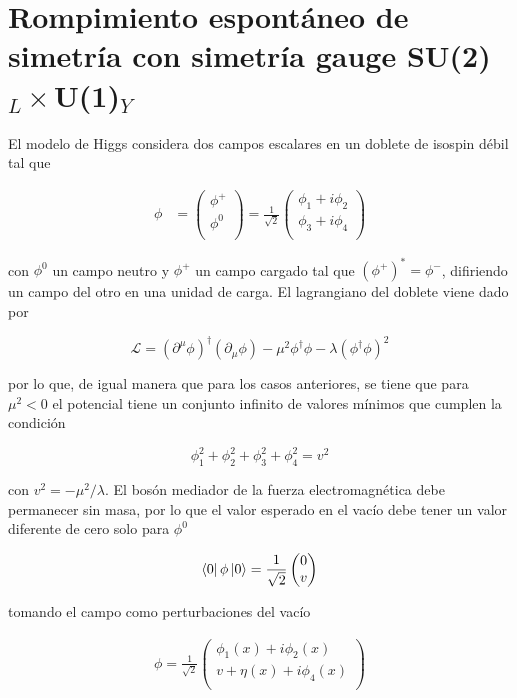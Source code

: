 \section{Rompimiento espontáneo de simetría con simetría gauge SU(2)$_L\times$U(1)$_Y$}

El modelo de Higgs considera dos campos escalares en un doblete de isospin débil tal que

\begin{align}
    \phi &= \begin{pmatrix}
           \phi^+ \\
           \phi^0 \\
         \end{pmatrix}
         = \frac{1}{\sqrt{2}} \begin{pmatrix}
            \phi_1+i\phi_2\\
            \phi_3+i\phi_4\\
         \end{pmatrix}
  \end{align}

con $\phi^0$ un campo neutro y $\phi^+$ un campo cargado tal que $(\phi^+)^* = \phi^-$, difiriendo un campo del otro en una unidad de carga. El lagrangiano del doblete viene dado por

$$ \mathcal{L} = (\partial^{\mu}\phi)^{\dagger} (\partial_{\mu}\phi) - \mu^2 \phi^{\dagger}\phi - \lambda(\phi^{\dagger}\phi)^2 $$

por lo que, de igual manera que para los casos anteriores, se tiene que para $\mu^2<0$ el potencial tiene un conjunto infinito de valores mínimos que cumplen la condición

$$ \phi_1^2 + \phi_2^2 + \phi_3^2 + \phi_4^2 = v^2 $$

con $v^2 =-\mu^2/\lambda$. El bosón mediador de la fuerza electromagnética debe permanecer sin masa, por lo que el valor esperado en el vacío debe tener un valor diferente de cero solo para $\phi^0$

\begin{align}
    \bra{0}\phi\ket{0} = \frac{1}{\sqrt{2}}\begin{pmatrix}
        0\\
        v\\
        \end{pmatrix}
\end{align}

tomando el campo como perturbaciones del vacío 

\begin{align}
    \phi = \frac{1}{\sqrt{2}}\begin{pmatrix}
        \phi_1(x)+i\phi_2(x)\\
        v+\eta(x)+i\phi_4(x)\\
        \end{pmatrix}
\end{align}

